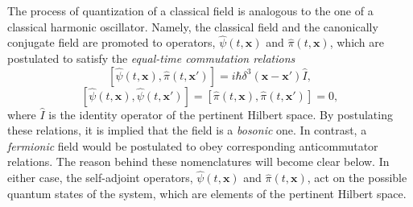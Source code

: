 \documentclass[
12pt,		%
openright,	%
twoside,  %
a4paper,			%
chapter=TITLE,		%
english,			%
french,				%
spanish,			%
brazil				%
]{USPSC-classe/USPSC}
\begin{document}
The process of quantization of a classical field is analogous to the one of a classical harmonic oscillator. Namely, the classical field and the canonically conjugate field are promoted to operators, $\hat{\psi}(t,\textbf{x})$ and $\hat{\pi}(t,\textbf{x})$, which are postulated to satisfy the \textit{equal-time commutation relations}
\begin{equation}\label{equal1}
    [\hat{\psi}(t,\textbf{x}),\hat{\pi}(t,\textbf{x}')]=i\hbar\delta^3(\textbf{x}-\textbf{x}')\hat{I},
\end{equation}
\begin{equation}\label{equal2}
    [\hat{\psi}(t,\textbf{x}),\hat{\psi}(t,\textbf{x}')]=[\hat{\pi}(t,\textbf{x}),\hat{\pi}(t,\textbf{x}')]=0,
\end{equation}
where $\hat{I}$ is the identity operator of the pertinent Hilbert space. By postulating these relations, it is implied that the field is a \textit{bosonic} one. In contrast, a \textit{fermionic} field would be postulated to obey corresponding  anticommutator relations. The reason behind these nomenclatures will become clear below. In either case, the self-adjoint operators, $\hat{\psi}(t,\textbf{x})$ and $\hat{\pi}(t,\textbf{x})$, act on the possible quantum states of the system, which are elements of the pertinent Hilbert space.
\end{document}
